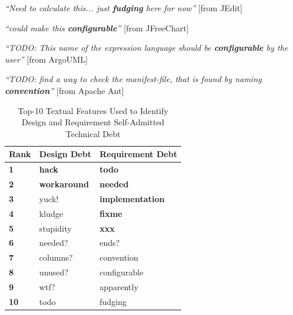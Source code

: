 \vspace{1mm}
\begin{displayquote}
\textit{``Need to calculate this... just \textbf{fudging} here for now''} [from JEdit]
\end{displayquote}
\vspace{1mm}
\begin{displayquote}
\textit{``could make this \textbf{configurable}''} [from JFreeChart]
\end{displayquote}
\vspace{1mm}
\begin{displayquote}
\textit{``TODO: This name of the expression language should be \textbf{configurable} by the user''} [from ArgoUML]
\end{displayquote}
\vspace{1mm}
\begin{displayquote}
\textit{``TODO: find a way to check the manifest-file, that is found by naming \textbf{convention}''} [from Apache Ant]
\end{displayquote}
\vspace{1mm}

\begin{table}[!thb]
    \begin{center}
        \caption{Top-10 Textual Features Used to Identify Design and Requirement Self-Admitted Technical Debt}
        \label{chap4:tbl:top_ten_features}
        \vspace{1mm}
        \begin{tabular}{l| l l }
        \toprule
        \textbf{Rank} & \textbf{Design Debt} & \textbf{Requirement Debt}  \\
        \midrule
         \textbf{1}  & \textbf{hack}       &   \textbf{todo}     \\
         \textbf{2}  & \textbf{workaround} &   \textbf{needed}   \\
         \textbf{3}  & yuck!      &   \textbf{implementation}    \\
         \textbf{4}  & kludge     &   \textbf{fixme}             \\
         \textbf{5}  & stupidity  &   \textbf{xxx}               \\
         \textbf{6}  & needed?    &   ends?             \\
         \textbf{7}  & columns?   &   convention        \\
         \textbf{8}  & unused?    &   configurable      \\
         \textbf{9}  & wtf?       &   apparently        \\
         \textbf{10} & todo       &   fudging           \\
        \bottomrule
        \end{tabular}
    \end{center}    
\end{table}

